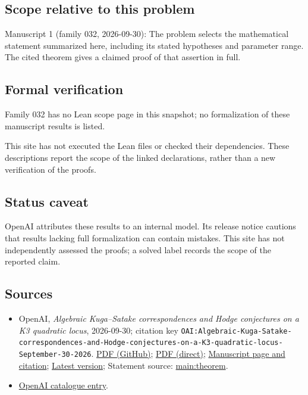 \documentclass[11pt]{article}
\begin{document}
\subsection{Scope relative to this problem}
Manuscript 1 (family 032, 2026-09-30): The problem selects the mathematical statement summarized here, including its stated hypotheses and parameter range. The cited theorem gives a claimed proof of that assertion in full.

\subsection{Formal verification}
Family 032 has no Lean scope page in this snapshot; no formalization of these manuscript results is listed.

This site has not executed the Lean files or checked their dependencies. These descriptions report the scope of the linked declarations, rather than a new verification of the proofs.

\subsection{Status caveat}
OpenAI attributes these results to an internal model. Its release notice cautions that results lacking full formalization can contain mistakes. This site has not independently assessed the proofs; a solved label records the scope of the reported claim.

\subsection{Sources}
\begin{itemize}
\item OpenAI, \emph{Algebraic Kuga–Satake correspondences and Hodge conjectures on a K3 quadratic locus}, 2026-09-30; citation key \texttt{OAI:Algebraic-Kuga-Satake-correspondences-and-Hodge-conjectures-on-a-K3-quadratic-locus-September-30-2026}. \href{https://github.com/openai/math/blob/adc7f1241b42e322a6451854ab7e4b4c146bf78a/preprints/Algebraic-Kuga-Satake-correspondences-and-Hodge-conjectures-on-a-K3-quadratic-locus-September-30-2026/paper.pdf}{PDF (GitHub)}; \href{https://github.com/openai/math/raw/adc7f1241b42e322a6451854ab7e4b4c146bf78a/preprints/Algebraic-Kuga-Satake-correspondences-and-Hodge-conjectures-on-a-K3-quadratic-locus-September-30-2026/paper.pdf}{PDF (direct)}; \href{https://github.com/openai/math/blob/adc7f1241b42e322a6451854ab7e4b4c146bf78a/preprints/Algebraic-Kuga-Satake-correspondences-and-Hodge-conjectures-on-a-K3-quadratic-locus-September-30-2026/README.md}{Manuscript page and citation}; \href{https://github.com/openai/math/blob/main/preprints/Algebraic-Kuga-Satake-correspondences-and-Hodge-conjectures-on-a-K3-quadratic-locus-September-30-2026/paper.pdf}{Latest version}; Statement source: \href{https://github.com/openai/math/blob/adc7f1241b42e322a6451854ab7e4b4c146bf78a/preprints/Algebraic-Kuga-Satake-correspondences-and-Hodge-conjectures-on-a-K3-quadratic-locus-September-30-2026/build/paper.tex\#L179}{main:theorem}.
\item \href{https://github.com/openai/math/blob/adc7f1241b42e322a6451854ab7e4b4c146bf78a/CONTENTS.md}{OpenAI catalogue entry}.
\end{itemize}
\end{document}

